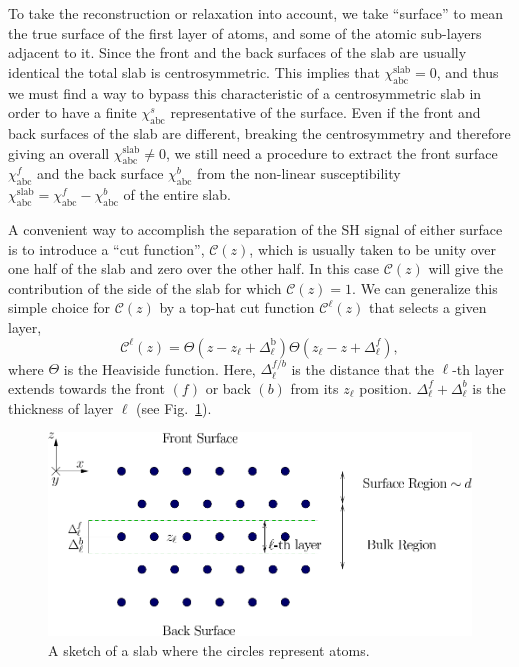 To take the reconstruction or relaxation into account, we take ``surface'' to
mean the true surface of the first layer of atoms, and some of the atomic
sub-layers adjacent to it. Since the front and the back surfaces of the slab are
usually identical the total slab is centrosymmetric. This implies that
$\chi^{\mathrm{slab}}_{\mathrm{abc}}=0$, and thus we must find a way to bypass
this characteristic of a centrosymmetric slab in order to have a finite
$\chi^s_{\mathrm{abc}}$ representative of the surface. Even if the front and
back surfaces of the slab are different, breaking the centrosymmetry and
therefore giving an overall $\chi^{\mathrm{slab}}_{\mathrm{abc}}\ne 0$, we still
need a procedure to extract the front surface $\chi^f_{\mathrm{abc}}$ and the
back surface $\chi^b_{\mathrm{abc}}$ from the non-linear susceptibility $\chi^{\mathrm{slab}}_{\mathrm{abc}}=\chi^f_{\mathrm{abc}}-\chi^b_{\mathrm{abc}}$ of the
entire slab.

A convenient way to accomplish the separation of the SH signal of either surface
is to introduce a ``cut function'', $\mathcal{C}(z)$, which is usually taken to be
unity over one half of the slab and zero over the other half.\cite{reiningPRB94}
In this case $\mathcal{C}(z)$ will give the contribution of the side of the slab for
which $\mathcal{C}(z)=1$. We can generalize this simple choice for $\mathcal{C}(z)$ by a
top-hat cut function $\mathcal{C}^{\ell}(z)$ that selects a given layer,
\begin{equation}
\label{sz}
\mathcal{C}^{\ell}(z)=\Theta(z-z_\ell+\Delta_\ell^{\mathrm{b}})
            \Theta(z_\ell-z+\Delta_\ell^f),
\end{equation}
where $\Theta$ is the Heaviside function. Here, $\Delta_\ell^{f/b}$
is the distance that the $\ell$-th layer extends towards the front
$(f)$ or back $(b)$ from its $z_\ell$ position. 
$\Delta_\ell^f+\Delta_\ell^b$ is the thickness of layer $\ell$ 
(see Fig.~\ref{fslab}).
\begin{figure}[b]
\centering
\includegraphics[scale=.7]{figures/01-nonlocal_chi2/slab.pdf}
\caption{A sketch of a slab where the circles represent atoms.\label{fslab}}
\end{figure}

